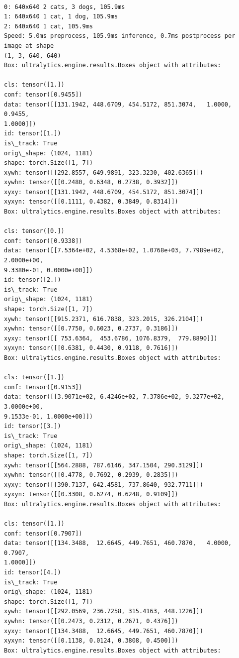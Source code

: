 \documentclass[11pt]{article}
\makeatletter
\newcommand{\boxspacing}{\kern\kvtcb@left@rule\kern\kvtcb@boxsep}
\newcommand{\prompt}[4]{
        {\ttfamily\llap{{\color{#2}[#3]:\hspace{3pt}#4}}\vspace{-\baselineskip}}
    }
\makeatother
\begin{document}
\begin{tcolorbox}[breakable, size=fbox, boxrule=1pt, pad at break*=1mm,colback=cellbackground, colframe=cellborder]
    \prompt{Out}{outcolor}{3}{\boxspacing}
    \begin{Verbatim}[commandchars=\\\{\}]

0: 640x640 2 cats, 3 dogs, 105.9ms
1: 640x640 1 cat, 1 dog, 105.9ms
2: 640x640 1 cat, 105.9ms
Speed: 5.0ms preprocess, 105.9ms inference, 0.7ms postprocess per image at shape
(1, 3, 640, 640)
Box: ultralytics.engine.results.Boxes object with attributes:

cls: tensor([1.])
conf: tensor([0.9455])
data: tensor([[131.1942, 448.6709, 454.5172, 851.3074,   1.0000,   0.9455,
1.0000]])
id: tensor([1.])
is\_track: True
orig\_shape: (1024, 1181)
shape: torch.Size([1, 7])
xywh: tensor([[292.8557, 649.9891, 323.3230, 402.6365]])
xywhn: tensor([[0.2480, 0.6348, 0.2738, 0.3932]])
xyxy: tensor([[131.1942, 448.6709, 454.5172, 851.3074]])
xyxyn: tensor([[0.1111, 0.4382, 0.3849, 0.8314]])
Box: ultralytics.engine.results.Boxes object with attributes:

cls: tensor([0.])
conf: tensor([0.9338])
data: tensor([[7.5364e+02, 4.5368e+02, 1.0768e+03, 7.7989e+02, 2.0000e+00,
9.3380e-01, 0.0000e+00]])
id: tensor([2.])
is\_track: True
orig\_shape: (1024, 1181)
shape: torch.Size([1, 7])
xywh: tensor([[915.2371, 616.7838, 323.2015, 326.2104]])
xywhn: tensor([[0.7750, 0.6023, 0.2737, 0.3186]])
xyxy: tensor([[ 753.6364,  453.6786, 1076.8379,  779.8890]])
xyxyn: tensor([[0.6381, 0.4430, 0.9118, 0.7616]])
Box: ultralytics.engine.results.Boxes object with attributes:

cls: tensor([1.])
conf: tensor([0.9153])
data: tensor([[3.9071e+02, 6.4246e+02, 7.3786e+02, 9.3277e+02, 3.0000e+00,
9.1533e-01, 1.0000e+00]])
id: tensor([3.])
is\_track: True
orig\_shape: (1024, 1181)
shape: torch.Size([1, 7])
xywh: tensor([[564.2888, 787.6146, 347.1504, 290.3129]])
xywhn: tensor([[0.4778, 0.7692, 0.2939, 0.2835]])
xyxy: tensor([[390.7137, 642.4581, 737.8640, 932.7711]])
xyxyn: tensor([[0.3308, 0.6274, 0.6248, 0.9109]])
Box: ultralytics.engine.results.Boxes object with attributes:

cls: tensor([1.])
conf: tensor([0.7907])
data: tensor([[134.3488,  12.6645, 449.7651, 460.7870,   4.0000,   0.7907,
1.0000]])
id: tensor([4.])
is\_track: True
orig\_shape: (1024, 1181)
shape: torch.Size([1, 7])
xywh: tensor([[292.0569, 236.7258, 315.4163, 448.1226]])
xywhn: tensor([[0.2473, 0.2312, 0.2671, 0.4376]])
xyxy: tensor([[134.3488,  12.6645, 449.7651, 460.7870]])
xyxyn: tensor([[0.1138, 0.0124, 0.3808, 0.4500]])
Box: ultralytics.engine.results.Boxes object with attributes:


\end{Verbatim}
\end{tcolorbox}
\end{document}
